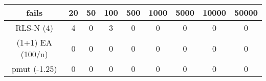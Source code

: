 \begin{tabular}[h]{ccccccccc}
fails&20&50&100&500&1000&5000&10000&50000\\\hline
RLS-N (4)&4&0&3&0&0&0&0&0\\
(1+1) EA (100/n)&0&0&0&0&0&0&0&0\\
pmut (-1.25)&0&0&0&0&0&0&0&0\\
\end{tabular}
